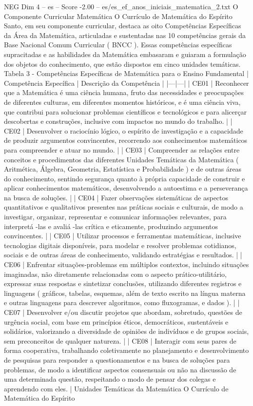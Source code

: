 \begin{textsample}{NEG Dim 4 – es – Score -2.00 – es/es\_ef\_anos\_iniciais\_matematica\_2.txt}  \label{ex:f4_neg_218}
O Componente Curricular Matemática O Currículo de Matemática do Espírito Santo, em seu componente curricular, destaca as oito Competências Específicas da Área da Matemática, articuladas e sustentadas nas 10 competências gerais da Base Nacional Comum Curricular ( BNCC ).
Essas competências específicas supracitadas e as habilidades da Matemática embasaram e guiaram a formulação dos objetos do conhecimento, que estão dispostos em cinco unidades temáticas.
Tabela 3 - Competências Específicas de Matemática para o Ensino Fundamental | Competência Específica | Descrição da Competência | |---|---| | CE01 | Reconhecer que a Matemática é uma ciência humana, fruto das necessidades e preocupações de diferentes culturas, em diferentes momentos históricos, e é uma ciência viva, que contribui para solucionar problemas científicos e tecnológicos e para alicerçar descobertas e construções, inclusive com impactos no mundo do trabalho. | | CE02 | Desenvolver o raciocínio lógico, o espírito de investigação e a capacidade de produzir argumentos convincentes, recorrendo aos conhecimentos matemáticos para compreender e atuar no mundo. | | CE03 | Compreender as relações entre conceitos e procedimentos das diferentes Unidades Temáticas da Matemática ( Aritmética, Álgebra, Geometria, Estatística e Probabilidade ) e de outras áreas do conhecimento, sentindo segurança quanto à própria capacidade de construir e aplicar conhecimentos matemáticos, desenvolvendo a autoestima e a perseverança na busca de soluções. | | CE04 | Fazer observações sistemáticas de aspectos quantitativos e qualitativos presentes nas práticas sociais e culturais, de modo a investigar, organizar, representar e comunicar informações relevantes, para interpretá -las e avaliá -las crítica e eticamente, produzindo argumentos convincentes. | | CE05 | Utilizar processos e ferramentas matemáticas, inclusive tecnologias digitais disponíveis, para modelar e resolver problemas cotidianos, sociais e de outras áreas de conhecimento, validando estratégias e resultados. | | CE06 | Enfrentar situações-problemas em múltiplos contextos, incluindo situações imaginadas, não diretamente relacionadas com o aspecto prático-utilitário, expressar suas respostas e sintetizar conclusões, utilizando diferentes registros e linguagens ( gráficos, tabelas, esquemas, além de texto escrito na língua materna e outras linguagens para descrever algoritmos, como fluxogramas, e dados ). | | CE07 | Desenvolver e/ou discutir projetos que abordam, sobretudo, questões de urgência social, com base em princípios éticos, democráticos, sustentáveis e solidários, valorizando a diversidade de opiniões de indivíduos e de grupos sociais, sem preconceitos de qualquer natureza. | | CE08 | Interagir com seus pares de forma cooperativa, trabalhando coletivamente no planejamento e desenvolvimento de pesquisas para responder a questionamentos e na busca de soluções para problemas, de modo a identificar aspectos consensuais ou não na discussão de uma determinada questão, respeitando o modo de pensar dos colegas e aprendendo com eles. | Unidades Temáticas da Matemática O Currículo de Matemática do Espírito 
\end{textsample}
